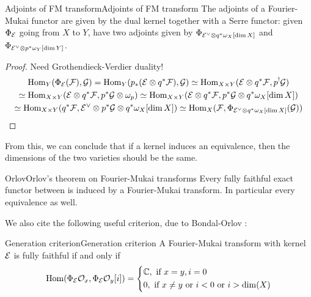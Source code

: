 \begin{proposition}{Adjoints of FM transform}{Adjoints of FM transform}
    The adjoints of a Fourier-Mukai functor are given by the dual kernel together with a Serre functor: given $\Phi_{\mathcal{E}}$ going from $X$ to $Y$, have two adjoints given by $\Phi_{\mathcal{E}^\vee\otimes q^*\omega_{X}[\dim X]}$ and $\Phi_{\mathcal{E}^\vee\otimes p^* \omega_{Y}[\dim Y]}$.
\end{proposition}
\begin{proof}
 Need Grothendieck-Verdier duality!
\begin{gather*}
    \operatorname{Hom}_Y(\Phi_{\mathcal{E}}(\mathcal{F}),\mathcal{G})
        = \operatorname{Hom}_Y(p_*(\mathcal{E}\otimes q^*\mathcal{F}),\mathcal{G})
        \simeq \operatorname{Hom}_{X\times Y}(\mathcal{E}\otimes q^*\mathcal{F},p^!\mathcal{G}) \\
        \simeq \operatorname{Hom}_{X\times Y}(\mathcal{E}\otimes q^*\mathcal{F},p^*\mathcal{G}\otimes\omega_p)
        \simeq \operatorname{Hom}_{X\times Y}(\mathcal{E}\otimes q^*\mathcal{F},p^*\mathcal{G}\otimes q^*\omega_X[\dim X]) \\
        \simeq \operatorname{Hom}_{X\times Y}(q^*\mathcal{F},\mathcal{E}^\vee\otimes p^*\mathcal{G}\otimes q^* \omega_X[\dim X])
        \simeq \operatorname{Hom}_X(\mathcal{F},\Phi_{\mathcal{E}^\vee\otimes q^*\omega_X[\dim X]}(\mathcal{G}))
\end{gather*}
\end{proof}
From this, we can conclude that if a kernel induces an equivalence, then the dimensions of the two varieties should be the same.

\begin{theorem}{Orlov}{Orlov's theorem on Fourier-Mukai transforms}
    Every fully faithful exact functor between is induced by a Fourier-Mukai transform. In particular every equivalence as well.
\end{theorem}

We also cite the following useful criterion, due to Bondal-Orlov \cite{bondal_semiorthogonal_1995}:
\begin{proposition}{Generation criterion}{Generation criterion}
    A Fourier-Mukai transform with kernel $\mathcal{E}$ is fully faithful if and only if \begin{gather*}
        \Hom (\Phi_\calE \O_x, \Phi_\calE \O_y[i])=\begin{cases*}
           \C, \text{ if }x=y, i=0\\
           0, \text{ if }x\neq y \text{ or } i<0 \text{ or } i> \dim(X)
        \end{cases*}
    \end{gather*}
    
\end{proposition}

